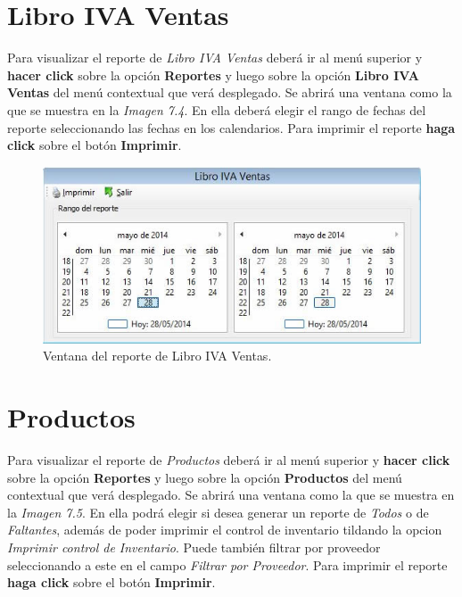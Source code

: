 \documentclass{book}
\begin{document}
\section{Libro IVA Ventas}

Para visualizar el reporte de \textit{Libro IVA Ventas} deberá ir al menú superior y \textbf{hacer click} sobre la opción \textbf{Reportes} y luego sobre la opción \textbf{Libro IVA Ventas} del menú contextual que verá desplegado. Se abrirá una ventana como la que se muestra en la \textit{Imagen 7.4}. En ella deberá elegir el rango de fechas del reporte seleccionando las fechas en los calendarios. Para imprimir el reporte \textbf{haga click} sobre el botón \textbf{Imprimir}.
\bigskip

\begin{figure}[H]
	\centering
	\includegraphics[width=1.0\textwidth]{images/ventanas/ventana-15.jpg}
	\caption{Ventana del reporte de Libro IVA Ventas.}
	\medskip
\end{figure}
\bigskip


\section{Productos}

Para visualizar el reporte de \textit{Productos} deberá ir al menú superior y \textbf{hacer click} sobre la opción \textbf{Reportes} y luego sobre la opción \textbf{Productos} del menú contextual que verá desplegado. Se abrirá una ventana como la que se muestra en la \textit{Imagen 7.5}. En ella podrá elegir si desea generar un reporte de \textit{Todos} o de \textit{Faltantes}, además de poder imprimir el control de inventario tildando la opcion \textit{Imprimir control de Inventario}. Puede también filtrar por proveedor seleccionando a este en el campo \textit{Filtrar por Proveedor}. Para imprimir el reporte \textbf{haga click} sobre el botón \textbf{Imprimir}.
\bigskip\bigskip
\end{document}
